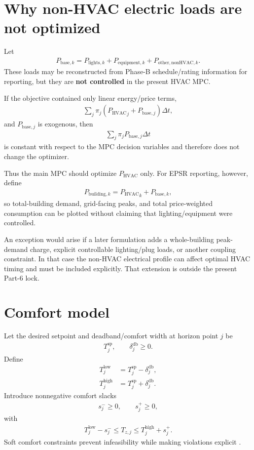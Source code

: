 \documentclass[11pt]{article}
\newcommand{\PHVAC}{P_{\mathrm{HVAC}}}
\newcommand{\dt}{\Delta t}
\begin{document}
\section{Why non-HVAC electric loads are not optimized}

Let
\begin{align}
P_{\mathrm{base},k}
=
P_{\mathrm{lights},k}
+
P_{\mathrm{equipment},k}
+
P_{\mathrm{other,nonHVAC},k}.
\tag{6.60}
\end{align}
These loads may be reconstructed from Phase-B schedule/rating information for reporting, but they
are \textbf{not controlled} in the present HVAC MPC.

If the objective contained only linear energy/price terms,
\begin{align}
\sum_j
\pi_j
\left(
{\PHVAC}_j
+
P_{\mathrm{base},j}
\right)\dt,
\end{align}
and \(P_{\mathrm{base},j}\) is exogenous, then
\begin{align}
\sum_j\pi_jP_{\mathrm{base},j}\dt
\end{align}
is constant with respect to the MPC decision variables and therefore does not change the optimizer.

Thus the main MPC should optimize \(\PHVAC\) only.  For EPSR reporting, however, define
\begin{align}
\boxed{
P_{\mathrm{building},k}
=
{\PHVAC}_k
+
P_{\mathrm{base},k},
}
\tag{6.61}
\end{align}
so total-building demand, grid-facing peaks, and total price-weighted consumption can be plotted
without claiming that lighting/equipment were controlled.

An exception would arise if a later formulation adds a whole-building peak-demand charge,
explicit controllable lighting/plug loads, or another coupling constraint.  In that case the
non-HVAC electrical profile can affect optimal HVAC timing and must be included explicitly.
That extension is outside the present Part-6 lock.

\section{Comfort model}

Let the desired setpoint and deadband/comfort width at horizon point \(j\) be
\begin{align}
T^{\mathrm{sp}}_j,
\qquad
\delta^{\mathrm{db}}_j\ge0.
\end{align}
Define
\begin{align}
T^{\mathrm{low}}_j
&=
T^{\mathrm{sp}}_j-\delta^{\mathrm{db}}_j,
\\
T^{\mathrm{high}}_j
&=
T^{\mathrm{sp}}_j+\delta^{\mathrm{db}}_j.
\tag{6.62}
\end{align}
Introduce nonnegative comfort slacks
\begin{align}
s_j^-\ge0,
\qquad
s_j^+\ge0,
\end{align}
with
\begin{align}
T^{\mathrm{low}}_j-s_j^-
\le
T_{z,j}
\le
T^{\mathrm{high}}_j+s_j^+.
\tag{6.63}
\end{align}
Soft comfort constraints prevent infeasibility while making violations explicit
\citep{ma2012predictive,drgona2020all}.
\end{document}
